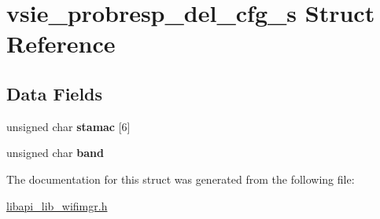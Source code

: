 \hypertarget{structvsie__probresp__del__cfg__s}{}\section{vsie\+\_\+probresp\+\_\+del\+\_\+cfg\+\_\+s Struct Reference}
\label{structvsie__probresp__del__cfg__s}
\subsection*{Data Fields}
\begin{DoxyCompactItemize}
\item 
\mbox{\label{structvsie__probresp__del__cfg__s_a31a520ceaf7d288596849c7cc78f7c3c}} 
unsigned char {\bfseries stamac} \mbox{[}6\mbox{]}
\item 
\mbox{\label{structvsie__probresp__del__cfg__s_ab0226158a7616525636194e5cb6381ba}} 
unsigned char {\bfseries band}
\end{DoxyCompactItemize}


The documentation for this struct was generated from the following file\+:\begin{DoxyCompactItemize}
\item 
\hyperlink{libapi__lib__wifimgr_8h}{libapi\+\_\+lib\+\_\+wifimgr.\+h}\end{DoxyCompactItemize}
